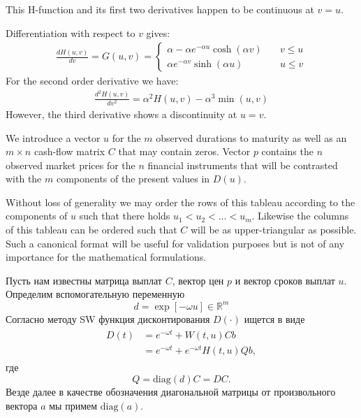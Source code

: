 \documentclass[10pt]{article}
\theoremstyle{definition}
\theoremstyle{remark}
\theoremstyle{plain}
\newcommand{\diag}{\mathrm{diag}}
\newcommand{\w}{f_\infty}
\begin{document}
This H-function and its first two derivatives happen to be continuous at $v=u$. 

Differentiation with respect to $v$ gives:
\begin{align}
\frac{dH(u,v)}{dv} = G(u,v) =
\left\{
	\begin{aligned}
	\alpha - \alpha	e^{-\alpha u} \cosh(\alpha v)&\quad v\leqslant u \\
	\alpha e^{-\alpha v}\sinh(\alpha u) &\quad u\leqslant v
	\end{aligned}
\right.
\end{align}
For the second order derivative we have:
\begin{align}
\frac{d^2H(u,v)}{dv^2} =\alpha^2 H(u,v) - \alpha^3\min(u,v)
\end{align}
However, the third derivative shows a discontinuity at $u=v$.

We introduce a vector $u$ for the $m$ observed durations to maturity as well as an $m\times n$ cash-flow matrix $C$ that may contain zeros. Vector $p$ contains the $n$ observed market prices for the $n$ financial instruments that will be contrasted with the $m$ components of the present values in $D(u)$. 

Without loss of generality we may order the rows of this tableau according to the
components of $u$ such that there holds $u_1< u_2< \ldots <u_m $. Likewise the columns of
this tableau can be ordered such that $C$ will be as upper-triangular as possible.
Such a canonical format will be useful for validation purposes but is not of any
importance for the mathematical formulations.

Пусть нам известны матрица выплат $C$, вектор цен $p$ и вектор сроков выплат $u$. Определим вспомогательную переменную
$$
d = \exp[-\omega u] \in \mathbb{R}^m
$$
Согласно методу SW функция дисконтирования $D(\cdot)$ ищется в виде
\begin{align}
\begin{aligned}
D(t) &= e^{-\omega t} + W(t,u)Cb \\
&= e^{-\omega t} + e^{-\omega t} H(t,u)Qb, 
\end{aligned}\label{discont}
\end{align}
где $$Q = \mathrm{diag}(d) C = D C.$$ 
Везде далее в качестве обозначения диагональной матрицы от произвольного вектора $a$ мы примем $\diag(a).$
\end{document}
